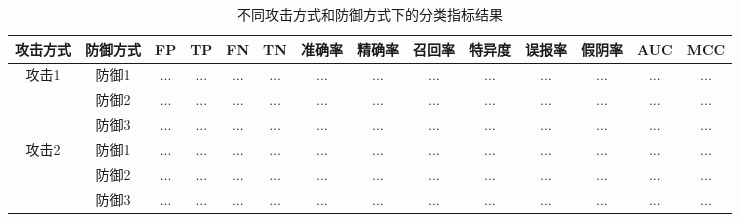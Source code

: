 \documentclass[lettersize,journal]{IEEEtran}
\begin{document}
\begin{table*}[h!]
\small
\centering
\begin{tabular}{|c|c|c|c|c|c|c|c|c|c|c|c|c|c|}
\hline
\textbf{攻击方式} & \textbf{防御方式} & \textbf{FP} & \textbf{TP} & \textbf{FN} & \textbf{TN} & \textbf{准确率} & \textbf{精确率} & \textbf{召回率} & \textbf{特异度} & \textbf{误报率} & \textbf{假阴率} & \textbf{AUC} & \textbf{MCC} \\ \hline

\multirow{3}{*}{攻击1} & 防御1 & ... & ... & ... & ... & ... & ... & ... & ... & ... & ... & ... & ... \\ \cline{2-14}
                       & 防御2 & ... & ... & ... & ... & ... & ... & ... & ... & ... & ... & ... & ... \\ \cline{2-14}
                       & 防御3 & ... & ... & ... & ... & ... & ... & ... & ... & ... & ... & ... & ... \\ \hline

\multirow{3}{*}{攻击2} & 防御1 & ... & ... & ... & ... & ... & ... & ... & ... & ... & ... & ... & ... \\ \cline{2-14}
                       & 防御2 & ... & ... & ... & ... & ... & ... & ... & ... & ... & ... & ... & ... \\ \cline{2-14}
                       & 防御3 & ... & ... & ... & ... & ... & ... & ... & ... & ... & ... & ... & ... \\ \hline
\end{tabular}
\caption{不同攻击方式和防御方式下的分类指标结果}
\end{table*}

\end{document}
